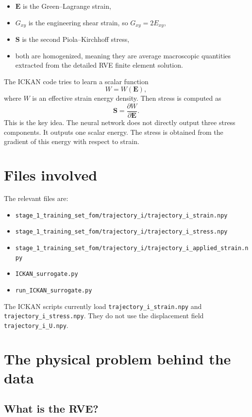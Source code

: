 \documentclass[11pt]{article}
\newcommand{\E}{\bm{E}}
\newcommand{\Sstress}{\bm{S}}
\begin{document}
\begin{itemize}[leftmargin=2em]
  \item $\E$ is the Green--Lagrange strain,
  \item $G_{xy}$ is the engineering shear strain, so $G_{xy}=2E_{xy}$,
  \item $\Sstress$ is the second Piola--Kirchhoff stress,
  \item both are homogenized, meaning they are average macroscopic quantities
        extracted from the detailed RVE finite element solution.
\end{itemize}

The ICKAN code tries to learn a scalar function
\[
  W = W(\E),
\]
where $W$ is an effective strain energy density. Then stress is computed as
\[
  \Sstress = \frac{\partial W}{\partial \E}.
\]
This is the key idea. The neural network does not directly output three stress
components. It outputs one scalar energy. The stress is obtained from the
gradient of this energy with respect to strain.

\section{Files involved}

The relevant files are:

\begin{itemize}[leftmargin=2em]
  \item \texttt{stage\_1\_training\_set\_fom/trajectory\_i/trajectory\_i\_strain.npy}
  \item \texttt{stage\_1\_training\_set\_fom/trajectory\_i/trajectory\_i\_stress.npy}
  \item \texttt{stage\_1\_training\_set\_fom/trajectory\_i/trajectory\_i\_applied\_strain.npy}
  \item \texttt{ICKAN\_surrogate.py}
  \item \texttt{run\_ICKAN\_surrogate.py}
\end{itemize}

The ICKAN scripts currently load \texttt{trajectory\_i\_strain.npy} and
\texttt{trajectory\_i\_stress.npy}. They do not use the displacement field
\texttt{trajectory\_i\_U.npy}.

\section{The physical problem behind the data}

\subsection{What is the RVE?}
\end{document}
